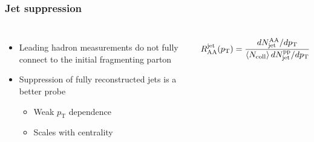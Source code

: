 \begin{frame}
  \frametitle{\textbf{Jet suppression}}
  \begin{columns}
    \begin{itemize}
    \item Leading hadron measurements do not fully connect to the initial fragmenting parton
    \item Suppression of fully reconstructed jets is a better probe
      \begin{itemize}
      \item Weak $p_{\text{T}}$ dependence
      \item Scales with centrality
      \end{itemize}
    \end{itemize}
    \begin{align*}
      R_{\text{AA}}^{\text{jet}} (p_{\text{T}}) = \cfrac{dN^{\text{AA}}_{\text{jet}} / dp_{\text{T}}}{\left< N_{\text{coll}} \right> dN^{\text{pp}}_{\text{jet}} / dp_{\text{T}}}
    \end{align*}
  \end{columns}
  \begin{columns}
  \end{columns}
\end{frame}

